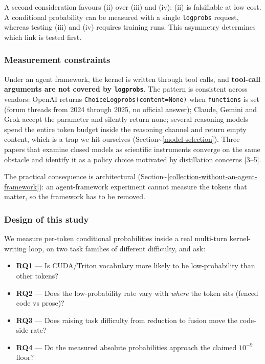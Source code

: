 \documentclass[
  11pt,
]{article}
\providecommand{\tightlist}{%
  \setlength{\itemsep}{0pt}\setlength{\parskip}{0pt}}
\begin{document}
A second consideration favours (ii) over (iii) and (iv): (ii) is
falsifiable at low cost. A conditional probability can be measured with
a single \texttt{logprobs} request, whereas testing (iii) and (iv)
requires training runs. This asymmetry determines which link is tested
first.

\hypertarget{measurement-constraints}{%
\subsubsection{Measurement constraints}\label{measurement-constraints}}

Under an agent framework, the kernel is written through tool calls, and
\textbf{tool-call arguments are not covered by \texttt{logprobs}}. The
pattern is consistent across vendors: OpenAI returns
\texttt{ChoiceLogprobs(content=None)} when \texttt{functions} is set
(forum threads from 2024 through 2025, no official answer); Claude,
Gemini and Grok accept the parameter and silently return none; several
reasoning models spend the entire token budget inside the reasoning
channel and return empty content, which is a trap we hit ourselves
(Section\textasciitilde{}\ref{model-selection}). Three papers that
examine closed models as scientific instruments converge on the same
obstacle and identify it as a policy choice motivated by distillation
concerns {[}3--5{]}.

The practical consequence is architectural
(Section\textasciitilde{}\ref{collection-without-an-agent-framework}):
an agent-framework experiment cannot measure the tokens that matter, so
the framework has to be removed.

\hypertarget{design-of-this-study}{%
\subsubsection{Design of this study}\label{design-of-this-study}}

We measure per-token conditional probabilities inside a real multi-turn
kernel-writing loop, on two task families of different difficulty, and
ask:

\begin{itemize}
\tightlist
\item
  \textbf{RQ1} --- Is CUDA/Triton vocabulary more likely to be
  low-probability than other tokens?
\item
  \textbf{RQ2} --- Does the low-probability rate vary with \emph{where}
  the token sits (fenced code vs prose)?
\item
  \textbf{RQ3} --- Does raising task difficulty from reduction to fusion
  move the code-side rate?
\item
  \textbf{RQ4} --- Do the measured absolute probabilities approach the
  claimed \(10^{-9}\) floor?
\end{itemize}
\end{document}
